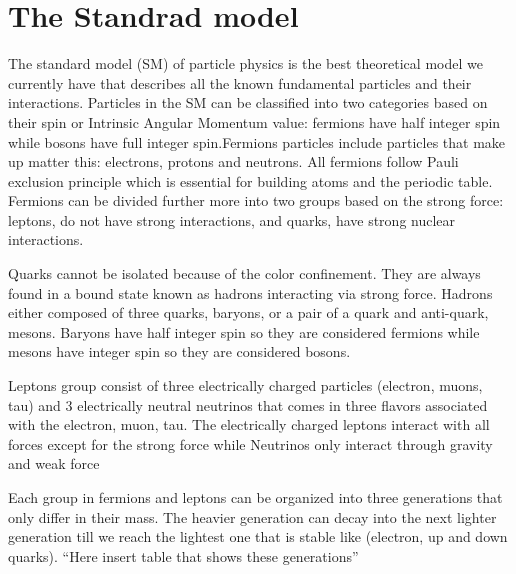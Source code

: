


\section{The Standrad model}
The standard model (SM) of particle physics is the best theoretical model we currently have that describes all the known fundamental particles and their interactions. Particles in the SM can be classified into two categories based on their spin or Intrinsic Angular Momentum value: fermions have half integer spin while bosons have full integer spin.Fermions particles include particles that make up matter this: electrons, protons and neutrons. All fermions follow Pauli exclusion principle which is essential for building atoms and the periodic table. Fermions can be divided further more into two groups based on the strong force: leptons, do not have strong interactions, and quarks, have strong nuclear interactions.

Quarks cannot be isolated because of the color confinement. They are always found in a bound state known as hadrons interacting via strong force. Hadrons either composed of three quarks, baryons, or a pair of a quark and anti-quark, mesons. Baryons have half integer spin so they are considered fermions while mesons have integer spin so they are considered bosons.

Leptons group consist of three electrically charged particles (electron, muons, tau) and 3 electrically neutral neutrinos that comes in three flavors associated with the electron, muon, tau. The electrically charged leptons interact with all forces except for the strong force while Neutrinos only interact through gravity and weak force

Each group in fermions and leptons can be organized into three generations that only differ in their mass. The heavier generation can decay into the next lighter generation till we reach the lightest one that is stable like (electron, up and  down quarks). “Here insert table that shows these generations”

